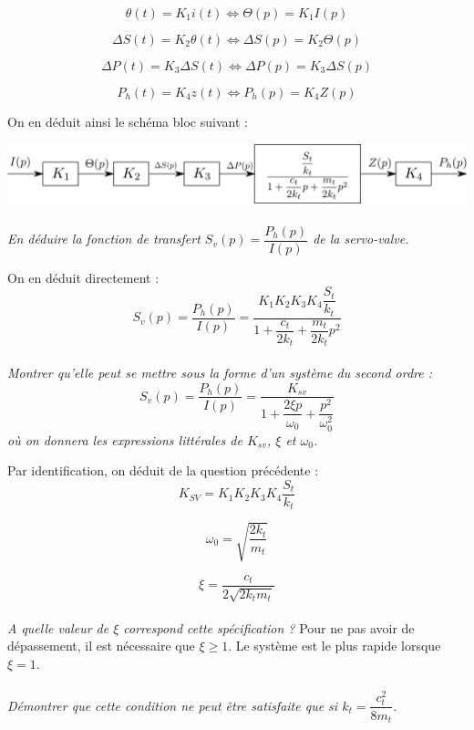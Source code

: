 \documentclass[10pt,oneside]{article}
\begin{document}
$$
\theta(t)=K_1 i(t) \Leftrightarrow \Theta(p)=K_1 I(p)
$$

$$
\Delta S(t) = K_2 \theta (t) \Leftrightarrow  \Delta S(p) = K_2 \Theta (p)
$$

$$
\Delta P(t) = K_3 \Delta S(t) \Leftrightarrow  \Delta P(p) = K_3 \Delta S(p) 
$$

$$
P_h(t)=K_4 z(t) \Leftrightarrow   P_h(p)=K_4 Z(p) 
$$

On en déduit ainsi le schéma bloc suivant :
\begin{center}
 \includegraphics[width=.8\textwidth]{png/blocs2}
\end{center}

\paragraph{}
\textit{En déduire la fonction de transfert $S_v(p)=\dfrac{P_h(p)}{I(p)}$ de la
servo-valve.}

On en déduit directement : 
$$
S_v(p)=\dfrac{P_h(p)}{I(p)} = \dfrac{K_1 K_2 K_3 K_4
\dfrac{S_t}{k_t}}{1+\dfrac{c_t}{2k_t}+\dfrac{m_t}{2k_t}p^2}
$$

\paragraph{}
\textit{Montrer qu'elle peut se mettre sous la forme d'un système du second ordre :}
$$
S_v(p)=\dfrac{P_h(p)}{I(p)}=\dfrac{K_{sv}}{1+\dfrac{2\xi p}{\omega_0}+\dfrac{p^2}{\omega_0^2}}
$$
\textit{où on donnera les expressions littérales de $K_{sv}$, $\xi$ et
$\omega_0$.}

Par identification, on déduit de la question précédente : 
$$
K_{SV} = K_1 K_2 K_3 K_4
\dfrac{S_t}{k_t}
$$

$$
\omega_0 = \sqrt{\dfrac{2k_t}{m_t}}
$$

$$
\xi = \dfrac{c_t}{2\sqrt{2k_t m_t}}
$$
\paragraph{}
\textit{A quelle valeur de $\xi$ correspond cette spécification ?}
Pour ne pas avoir de dépassement, il est nécessaire que $\xi \geq 1$. Le
système est le plus rapide lorsque $\xi=1$.

\paragraph{}
\textit{Démontrer que cette condition ne peut être satisfaite que si
$k_t=\dfrac{c_t^2}{8m_t}$.}
\end{document}
